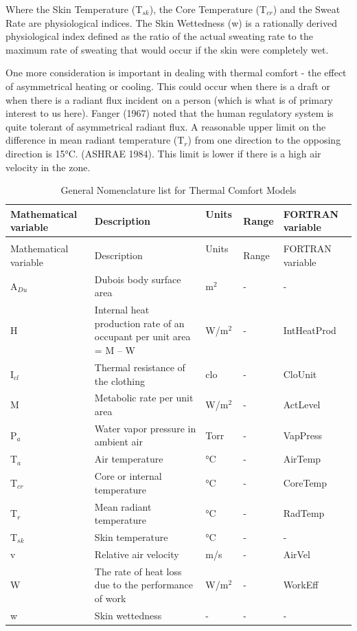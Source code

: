 Where the Skin Temperature (T\(_{sk}\)), the Core Temperature (T\(_{cr}\)) and the Sweat Rate are physiological indices. The Skin Wettedness (w) is a rationally derived physiological index defined as the ratio of the actual sweating rate to the maximum rate of sweating that would occur if the skin were completely wet.

One more consideration is important in dealing with thermal comfort - the effect of asymmetrical heating or cooling. This could occur when there is a draft or when there is a radiant flux incident on a person (which is what is of primary interest to us here). Fanger (1967) noted that the human regulatory system is quite tolerant of asymmetrical radiant flux. A reasonable upper limit on the difference in mean radiant temperature (T\(_{r}\)) from one direction to the opposing direction is 15°C. (ASHRAE 1984). This limit is lower if there is a high air velocity in the zone.

\begin{longtable}[c]{p{1.2in}p{2.0in}p{0.8in}p{0.8in}p{1.2in}}
\caption{General Nomenclature list for Thermal Comfort Models \label{table:general-nomenclature-list-for-thermal-comfort}} \tabularnewline
\toprule 
Mathematical variable & Description & Units ~ & Range & FORTRAN variable \tabularnewline
\midrule
\endfirsthead

\caption[]{General Nomenclature list for Thermal Comfort Models} \tabularnewline
\toprule 
Mathematical variable & Description & Units ~ & Range & FORTRAN variable \tabularnewline
\midrule
\endhead

A\(_{Du}\) & Dubois body surface area & m\(^{2}\) & - & - \tabularnewline
H & Internal heat production rate of an occupant per unit area = M – W & W/m\(^{2}\) & - & IntHeatProd \tabularnewline
I\(_{cl}\) & Thermal resistance of the clothing & clo & - & CloUnit \tabularnewline
M & Metabolic rate per unit area & W/m\(^{2}\) & - & ActLevel \tabularnewline
P\(_{a}\) & Water vapor pressure in ambient air & Torr & - & VapPress \tabularnewline
T\(_{a}\) & Air temperature & °C & - & AirTemp \tabularnewline
T\(_{cr}\) & Core or internal temperature & °C & - & CoreTemp \tabularnewline
T\(_{r}\) & Mean radiant temperature & °C & - & RadTemp \tabularnewline
T\(_{sk}\) & Skin temperature & °C & - & - \tabularnewline
v & Relative air velocity & m/s & - & AirVel \tabularnewline
W & The rate of heat loss due to the performance of work & W/m\(^{2}\) & - & WorkEff \tabularnewline
w & Skin wettedness & - & - & - \tabularnewline
\bottomrule
\end{longtable}

